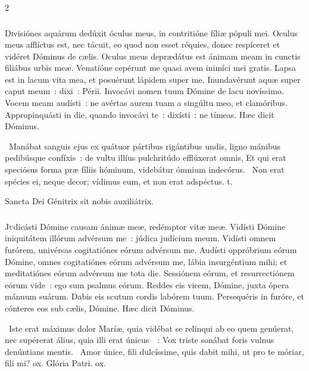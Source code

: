\documentclass[9pt,twoside]{extarticle}
\begin{document}
\begin{multicols}{2}
{\subsubsection*{\center {}}
\lettrine{D}ivisiónes aquárum dedúxit óculus meus, in contritióne fíliæ pópuli mei.
Oculus meus afflíctus est, nec tácuit, eo quod non esset réquies,
donec respíceret et vidéret Dóminus de cælis.
Oculus meus deprædátus est ánimam meam in cunctis filiábus urbis meæ.
Venatióne cepérunt me quasi avem inimíci mei gratis.
Lapsa est in lacum vita mea, et posuérunt lápidem super me.
Inundavérunt aquæ super caput meum~: dixi~: Périi.
Invocávi nomen tuum Dómine de lacu novíssimo.
Vocem meam audísti~: ne avértas aurem tuam a singúltu meo, et clamóribus.
Appropinquásti in die, quando invocávi te~: dixísti~: ne tímeas. Hæc dicit Dóminus.

\begin{tightlist}{}
\item {}~Manábat sanguis ejus ex quátuor pártibus rigántibus undis, ligno mánibus pedibúsque confíxis~: de vultu illíus pulchritúdo efflúxerat omnis, \textred{*} Et qui erat speciósus forma præ fíliis hóminum, videbátur ómnium indecórus. ~Non erat spécies ei, neque decor; vídimus eum, et non erat adspéctus. t.
\item {\small {} Sancta Dei Génitrix sit nobis auxiliátrix.}
\end{tightlist}

\subsubsection*{\center {}}
\lettrine{J}udicásti Dómine causam ánimæ meæ, redémptor vitæ meæ.
Vidísti Dómine iniquitátem illórum advérsum me~: júdica judícium meum.
Vidísti omnem furórem, univérsas cogitatiónes eórum advérsum me.
Audísti oppróbrium eórum Dómine, omnes cogitatiónes eórum advérsum me,
lábia insurgéntium mihi; et meditatiónes eórum advérsum me tota die.
Sessiónem eórum, et resurrectiónem eórum vide~: ego sum psalmus eórum.
Reddes eis vicem, Dómine, juxta ópera mánuum suárum.
Dabis eis scutum cordis labórem tuum.
Persequéris in furóre, et cónteres eos sub cælis, Dómine. Hæc dicit Dóminus.

\begin{tightlist}{}
\item {}~Iste erat máximus dolor Maríæ, quia vidébat se relínqui ab eo quem genúerat, nec supérerat álius, quia illi erat únicus~~: \textred{*} Vox triste sonábat foris vulnus denúntians mentis. ~Amor únice, fili dulcíssime, quis dabit mihi, ut pro te móriar, fili mi? ox. Glória Patri. ox.
\end{tightlist}

}
\end{multicols}
\end{document}
